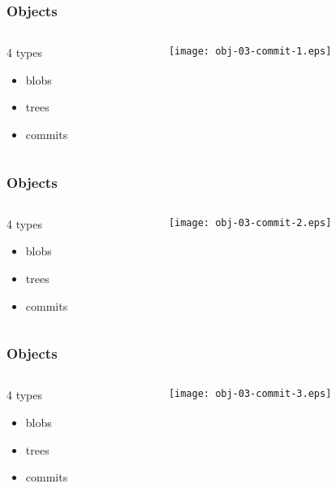 \documentclass[english]{beamer}
\newcommand{\faint}[1]{%
\textcolor{code-gray}{#1}%
}
\begin{document}
\begin{frame}
\frametitle{Objects}
\begin{columns}[t]
        \begin{column}[T]{.5\textwidth}
                4 types
                \begin{itemize}
                        \item \faint{blobs}
                        \item \faint{trees}
                        \item commits
                \end{itemize}
        \end{column}
        \begin{column}[T]{.5\textwidth}
                \texttt{[image: obj-03-commit-1.eps]}
        \end{column}
\end{columns}
\end{frame}

\begin{frame}
\frametitle{Objects}
\begin{columns}[t]
        \begin{column}[T]{.5\textwidth}
                4 types
                \begin{itemize}
                        \item \faint{blobs}
                        \item \faint{trees}
                        \item commits
                \end{itemize}
        \end{column}
        \begin{column}[T]{.5\textwidth}
                \texttt{[image: obj-03-commit-2.eps]}
        \end{column}
\end{columns}
\end{frame}

\begin{frame}
\frametitle{Objects}
\begin{columns}[t]
        \begin{column}[T]{.5\textwidth}
                4 types
                \begin{itemize}
                        \item \faint{blobs}
                        \item \faint{trees}
                        \item commits
                \end{itemize}
        \end{column}
        \begin{column}[T]{.5\textwidth}
                \texttt{[image: obj-03-commit-3.eps]}
        \end{column}
\end{columns}
\end{frame}
\end{document}
